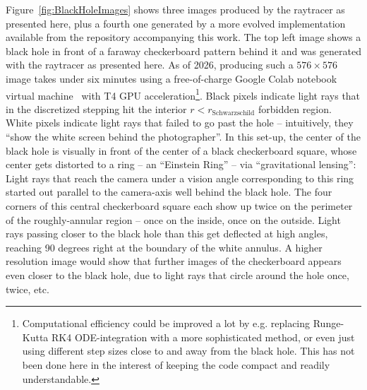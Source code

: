 \documentclass[twocolumn]{article}
\begin{document}
Figure~\ref{fig:BlackHoleImages} shows three images produced by the
raytracer as presented here, plus a fourth one generated by a more
evolved implementation available from the repository accompanying this
work. The top left image shows a black hole in front of a faraway
checkerboard pattern behind it and was generated with the raytracer as
presented here. As of 2026, producing such a $576\times 576$ image
takes under six minutes using a free-of-charge Google Colab notebook
virtual machine~\cite{bisong2019google} with T4 GPU
acceleration\footnote{Computational efficiency could be improved a lot
by e.g. replacing Runge-Kutta RK4 ODE-integration with a more
sophisticated method, or even just using different step sizes close to
and away from the black hole. This has not been done here in the
interest of keeping the code compact and readily
understandable.}. Black pixels indicate light rays that in the
discretized stepping hit the interior $r<r_{\text{Schwarzschild}}$
forbidden region. White pixels indicate light rays that failed to go
past the hole -- intuitively, they ``show the white screen behind the
photographer''. In this set-up, the center of the black hole is
visually in front of the center of a black checkerboard square, whose
center gets distorted to a ring -- an ``Einstein Ring'' -- via
``gravitational lensing'': Light rays that reach the camera under a
vision angle corresponding to this ring started out parallel to the
camera-axis well behind the black hole. The four corners of this
central checkerboard square each show up twice on the perimeter of the
roughly-annular region -- once on the inside, once on the
outside. Light rays passing closer to the black hole than this get
deflected at high angles, reaching 90 degrees right at the boundary of
the white annulus. A higher resolution image would show that further
images of the checkerboard appears even closer to the black hole, due
to light rays that circle around the hole once, twice, etc.
\end{document}
